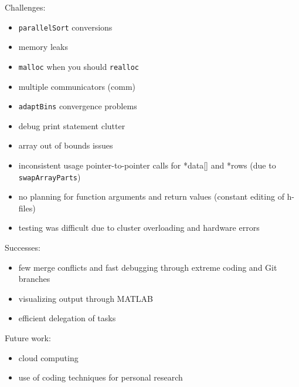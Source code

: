 \documentclass{article}
\begin{document}
\begin{mdframed}[backgroundcolor=red!20]
	Challenges:
	\begin{itemize}
		\item \texttt{parallelSort} conversions
		\item memory leaks
		\item \texttt{malloc} when you should \texttt{realloc}
		\item multiple communicators (comm)
		\item \texttt{adaptBins} convergence problems
		\item debug print statement clutter
		\item array out of bounds issues
		\item inconsistent usage pointer-to-pointer calls for *data[] and *rows (due to \texttt{swapArrayParts})
		\item no planning for function arguments and return values (constant editing of h-files)
		\item testing was difficult due to cluster overloading and hardware errors
	\end{itemize}
\end{mdframed}

\begin{mdframed}[backgroundcolor=green!20]
	Successes:
	\begin{itemize}
		\item few merge conflicts and fast debugging through extreme coding and Git branches
		\item visualizing output through MATLAB
		\item efficient delegation of tasks
	\end{itemize}
\end{mdframed}

\begin{mdframed}[backgroundcolor=blue!20]
	Future work:
	\begin{itemize}
		\item cloud computing
		\item use of coding techniques for personal research
	\end{itemize}
\end{mdframed}






\end{document}
